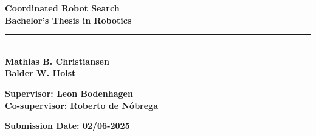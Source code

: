 \begin{titlepage}
    {\Huge \textbf{Coordinated Robot Search}} \\[0.5cm]
    {\Large \textbf{Bachelor's Thesis in Robotics}} \\[3mm]
    \noindent\rule{\textwidth}{1pt} \\[15mm]
    {\Large \textbf{Mathias B. Christiansen}} \\
    {\Large \textbf{Balder W. Holst}}

    \vfill


    {\large
        \textbf{Supervisor: Leon Bodenhagen} \\
        \textbf{Co-supervisor: Roberto de Nóbrega} \\[3mm]
    }

    {\large
        \textbf{Submission Date: 02/06-2025}
    }

\end{titlepage}
